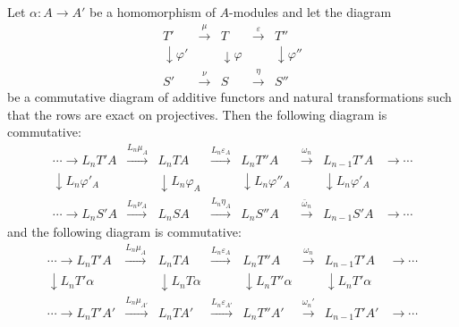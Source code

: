 \begin{proposition}
Let $\alpha: A \rightarrow A'$ be a homomorphism of $A$-modules and let the diagram
\[
\begin{array}{ccccc}
T' & \xrightarrow{\mu} & T & \xrightarrow{\varepsilon} & T'' \\
\downarrow\scriptstyle{\varphi'} & & \downarrow\scriptstyle{\varphi} & & \downarrow\scriptstyle{\varphi''} \\
S' & \xrightarrow{\nu} & S & \xrightarrow{\eta} & S''
\end{array}
\]
be a commutative diagram of additive functors and natural transformations such that the rows are exact on projectives. Then the following diagram is commutative:
\[
\begin{array}{ccccccc}
\cdots \rightarrow L_n T' A & \xrightarrow{L_n \mu_A} & L_n T A & \xrightarrow{L_n \varepsilon_A} & L_n T'' A & \xrightarrow{\omega_n} & L_{n-1} T' A & \rightarrow \cdots \\
\downarrow\scriptstyle{L_n \varphi'_A} & & \downarrow\scriptstyle{L_n \varphi_A} & & \downarrow\scriptstyle{L_n \varphi''_A} & & \downarrow\scriptstyle{L_n \varphi'_A} \\
\cdots \rightarrow L_n S' A & \xrightarrow{L_n \nu_A} & L_n S A & \xrightarrow{L_n \eta_A} & L_n S'' A & \xrightarrow{\bar{\omega}_n} & L_{n-1} S' A & \rightarrow \cdots
\end{array}
\]
and the following diagram is commutative:
\[
\begin{array}{ccccccc}
\cdots \rightarrow L_n T' A & \xrightarrow{L_n \mu_A} & L_n T A & \xrightarrow{L_n \varepsilon_A} & L_n T'' A & \xrightarrow{\omega_n} & L_{n-1} T' A & \rightarrow \cdots \\
\downarrow\scriptstyle{L_n T' \alpha} & & \downarrow\scriptstyle{L_n T \alpha} & & \downarrow\scriptstyle{L_n T'' \alpha} & & \downarrow\scriptstyle{L_n T' \alpha} \\
\cdots \rightarrow L_n T' A' & \xrightarrow{L_n \mu_{A'}} & L_n T A' & \xrightarrow{L_n \varepsilon_{A'}} & L_n T'' A' & \xrightarrow{\omega_n'} & L_{n-1} T' A' & \rightarrow \cdots
\end{array}
\]
\end{proposition}
